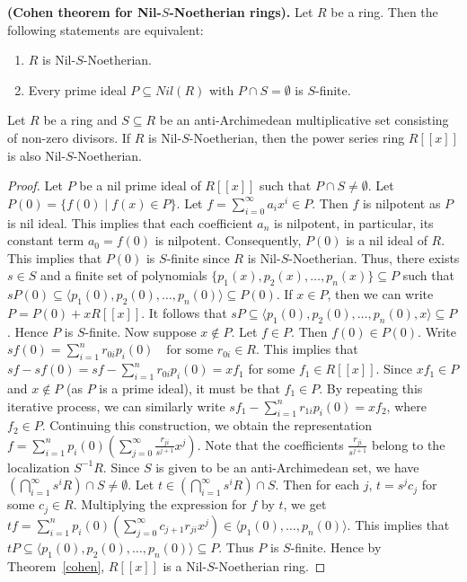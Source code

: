 \documentclass[10pt,a4paper]{amsart}
\begin{document}
\begin{theorem} \label{cohen}\textbf{(Cohen theorem for Nil-$S$-Noetherian rings).}
Let $R$ be a ring. Then the following statements are equivalent:
\begin{enumerate}
    \item $R$ is Nil-$S$-Noetherian. 
    \item Every prime ideal $P \subseteq Nil(R)$ with $P \cap S = \emptyset$ is $S$-finite.
\end{enumerate}
\end{theorem}

\begin{theorem} \label{Hilbert-2}
	Let $R$ be a ring and $S \subseteq R$ be an anti-Archimedean multiplicative set  consisting of non-zero divisors. If $R$ is Nil-$S$-Noetherian, then the power series ring $R[[x]]$ is also Nil-$S$-Noetherian.
\end{theorem}

\begin{proof}
Let $P$ be a nil prime ideal of $R[[x]]$ such that $P\cap S\neq\emptyset$.	 Let
	$ P(0) = \{f(0) \mid f(x) \in P\} $. 
	Let $f= \sum_{i=0}^{\infty}a_{i}x^{i} \in P$. Then $f$ is nilpotent as $P$ is nil ideal. This implies that each coefficient $a_{n}$ is nilpotent, in particular, its constant term $a_{0} = f(0)$ is nilpotent.
	Consequently, $P(0)$ is a nil ideal of $R$. This implies that $P(0)$ is $S$-finite since $R$ is Nil-$S$-Noetherian. Thus, there exists $s \in S$ and a finite set of polynomials $\{p_1(x), p_2(x), \dots, p_n(x)\} \subseteq P$ such that
	$ sP(0) \subseteq \langle p_1(0), p_2(0), \dots, p_n(0) \rangle \subseteq P(0) $.
	If $x \in P$, then we can write $P = P(0) + xR[[x]]$. It follows that
	 $sP \subseteq \langle p_1(0), p_2(0), \dots, p_n(0), x \rangle \subseteq P$.
	Hence $P$ is $S$-finite.
	 Now suppose  $x \notin P$.
	Let $f \in P$. Then $f(0) \in P(0)$. Write
	$ sf(0) = \sum_{i=1}^{n} r_{0i} p_i(0) \quad \text{for some } r_{0i} \in R$.
	This implies that
	$ sf -  sf(0) = sf- \sum_{i=1}^{n} r_{0i} p_i(0) = xf_1 $
	for some $f_1 \in R[[x]]$. Since $xf_1 \in P$ and $x \notin P$ (as $P$ is a prime ideal), it must be that $f_1 \in P$. 	
	By repeating this iterative process, we can similarly write
	$sf_1 - \sum_{i=1}^{n} r_{1i} p_i(0) = xf_2 $,
	where $f_2 \in P$. Continuing this construction, we obtain the representation
	$ f = \sum_{i=1}^{n} p_i(0) \left( \sum_{j=0}^{\infty} \frac{r_{ji}}{s^{j+1}} x^j \right) $.
	Note that the coefficients $\frac{r_{ji}}{s^{j+1}}$ belong to the localization $S^{-1}R$. Since $S$ is given to be an anti-Archimedean set, we have
	$ \left( \bigcap_{i=1}^{\infty} s^i R \right) \cap S \neq \emptyset $.
	Let $t \in \left( \bigcap_{i=1}^{\infty} s^i R \right) \cap S$. Then for each $j$, $t = s^j c_j$ for some $c_j \in R$. 
	Multiplying the expression for $f$ by $t$, we get
	$ tf = \sum_{i=1}^{n} p_i(0) \left( \sum_{j=0}^{\infty} c_{j+1} r_{ji} x^j \right) \in \langle p_1(0), \dots, p_n(0) \rangle $.
	This implies that
	$ tP \subseteq \langle p_1(0), p_2(0), \dots, p_n(0) \rangle \subseteq P$.
	Thus $P$ is $S$-finite. Hence by Theorem~\ref{cohen}, $R[[x]]$ is a Nil-$S$-Noetherian ring.
	
\end{proof}
\end{document}
